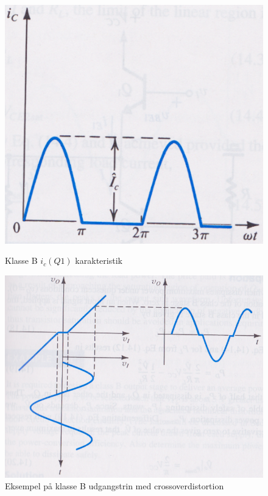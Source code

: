 \begin{figure}[ht]
\begin{minipage}[b]{0.5\linewidth}
\centering
\includegraphics[scale=.35]{valg_af_loesning/klasser/klasseb.png}
\caption{Klasse B $i_c (Q1)$ karakteristik\cite{sedra-smith}}
\label{fig:klasseb}
\end{minipage}
\hspace{0.5cm}
\begin{minipage}[b]{0.5\linewidth}
\centering
\includegraphics[scale=.25]{valg_af_loesning/klasser/klassebproblem.png}
\caption{Eksempel på klasse B udgangstrin med crossoverdistortion\cite{sedra-smith}}
\label{fig:classbproblem}
\end{minipage}
\end{figure}



